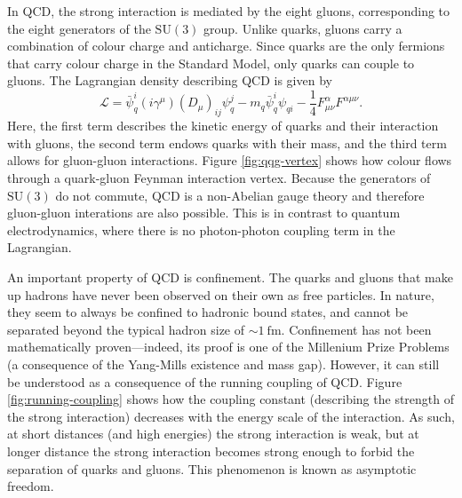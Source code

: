 \documentclass[12pt,a4paper]{report}
\begin{document}
In QCD, the strong interaction is mediated by the eight gluons, corresponding to the eight generators of the $\text{SU}(3)$ group. Unlike quarks, gluons carry a combination of colour charge and anticharge. Since quarks are the only fermions that carry colour charge in the Standard Model, only quarks can couple to gluons. The Lagrangian density describing QCD is given by
\begin{equation}
  \mathcal{L} = \bar{\psi}_q^i (i \gamma^\mu) (D_\mu)_{ij} \psi_q^j - m_q \bar{\psi}^i_q \psi_{qi} - \frac{1}{4} F_{\mu\nu}^\alpha F^{\alpha\mu\nu}.
\end{equation}
Here, the first term describes the kinetic energy of quarks and their interaction with gluons, the second term endows quarks with their mass, and the third term allows for gluon-gluon interactions. Figure \ref{fig:qqg-vertex} shows how colour flows through a quark-gluon Feynman interaction vertex. Because the generators of $\text{SU}(3)$ do not commute, QCD is a non-Abelian gauge theory and therefore gluon-gluon interations are also possible. This is in contrast to quantum electrodynamics, where there is no photon-photon coupling term in the Lagrangian.

\begin{figure}
  \centering

\end{figure}

An important property of QCD is confinement. The quarks and gluons that make up hadrons have never been observed on their own as free particles. In nature, they seem to always be confined to hadronic bound states, and cannot be separated beyond the typical hadron size of $\sim \qty{1}{\femto\meter}$. Confinement has not been mathematically proven---indeed, its proof is one of the Millenium Prize Problems (a consequence of the Yang-Mills existence and mass gap). However, it can still be understood as a consequence of the running coupling of QCD. Figure \ref{fig:running-coupling} shows how the coupling constant (describing the strength of the strong interaction) decreases with the energy scale of the interaction. As such, at short distances (and high energies) the strong interaction is weak, but at longer distance the strong interaction becomes strong enough to forbid the separation of quarks and gluons. This phenomenon is known as asymptotic freedom.
\end{document}
